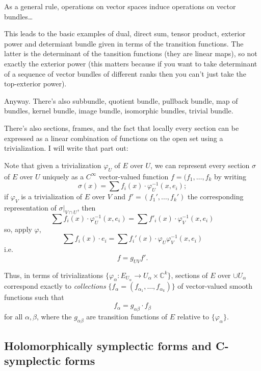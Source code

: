 \begin{enumerate}
As a general rule, operations on vector spaces induce operations on vector bundles… 

This leads to the basic examples of dual, direct sum, tensor product, exterior power and determiant bundle given in terms of the transition functions. The latter is the determinant of the tansition functions (they are linear maps), so not exactly the exterior power (this matters because if you want to take determinant of a sequence of vector bundles of different ranks then you can't just take the top-exterior power). 

Anyway. There's also subbundle, quotient bundle, pullback bundle, map of bundles, kernel bundle, image bundle, isomorphic bundles, trivial bundle.

There's also sections, frames, and the fact that locally every section can be expressed as a linear combination of functions on the open set using a trivialization. I will write that part out:

Note that given a trivialization \(\varphi_{U}\) of \(E\) over \(U\), we can represent every section \(\sigma\) of \(E\) over \(U\) uniquely as a \(C^\infty\) vector-valued function \(f=(f_1,\ldots,f_k\) by writing
\[\sigma(x)= \sum f_i(x) \cdot \varphi_U^{-1}(x,e_i);\]
if  \(\varphi_V\) is a trivialization of \(E\) over \(V\) and \(f'=(f_1',\ldots,f_k')\) the corresponding representation of  \(\sigma|_{V \cap U}\), then
\[\sum f_i(x) \cdot \varphi_U^{-1}(x,e_i)=\sum f'_i(x)\cdot \varphi_V^{-1}(x,e_i)\]
so, apply \(\varphi\),
\[\sum f_i(x)\cdot e_i=\sum f_i'(x) \cdot \varphi_U \varphi_V^{-1}(x,e_i)\]
i.e.
\[f=g_{UV}f'.\]
\begin{tcolorbox}[colback=white,colframe=black,boxrule=0.5pt,sharp corners]
Thus, in terms of trivializations $\{\varphi_\alpha:E_{U_\alpha}\to U_\alpha\times \mathbb{C}^k\}$, sections of $E$ over $\cup U_\alpha$ correspond exactly to \textit{collections} $\{f_\alpha=(f_{\alpha_1},\ldots,f_{\alpha_k})\}$ of vector-valued smooth functions such that
\[
f_\alpha=g_{\alpha\beta}\cdot f_\beta
\]
for all $\alpha,\beta$, where the $g_{\alpha\beta}$ are transition functions of $E$ relative to $\{\varphi_\alpha\}$.
\end{tcolorbox}


\end{enumerate}


\subsection{Holomorphically symplectic forms and C-symplectic forms}


